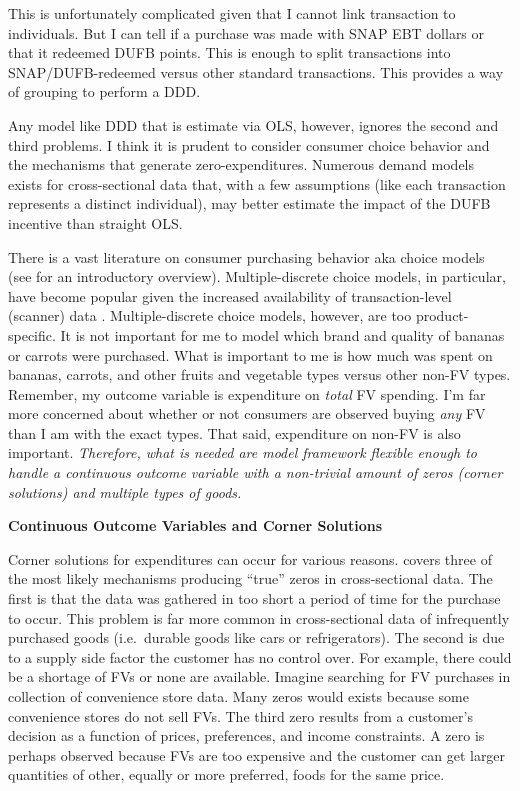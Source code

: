 \documentclass[12pt,letterpaperpaper,]{book}
\begin{document}
This is unfortunately complicated given that I cannot link transaction
to individuals. But I can tell if a purchase was made with SNAP EBT
dollars or that it redeemed DUFB points. This is enough to split
transactions into SNAP/DUFB-redeemed versus other standard transactions.
This provides a way of grouping to perform a DDD.

Any model like DDD that is estimate via OLS, however, ignores the second
and third problems. I think it is prudent to consider consumer choice
behavior and the mechanisms that generate zero-expenditures. Numerous
demand models exists for cross-sectional data that, with a few
assumptions (like each transaction represents a distinct individual),
may better estimate the impact of the DUFB incentive than straight OLS.

There is a vast literature on consumer purchasing behavior aka choice
models (see \citet{train_discrete_2009} for an introductory overview).
Multiple-discrete choice models, in particular, have become popular
given the increased availability of transaction-level (scanner) data
\citep{dube_multiple_2004, hendel_estimating_1999}. Multiple-discrete
choice models, however, are too product-specific. It is not important
for me to model which brand and quality of bananas or carrots were
purchased. What is important to me is how much was spent on bananas,
carrots, and other fruits and vegetable types versus other non-FV types.
Remember, my outcome variable is expenditure on \emph{total} FV
spending. I'm far more concerned about whether or not consumers are
observed buying \emph{any} FV than I am with the exact types. That said,
expenditure on non-FV is also important. \emph{Therefore, what is needed
are model framework flexible enough to handle a continuous outcome
variable with a non-trivial amount of zeros (corner solutions) and
multiple types of goods.}

\textbf{Continuous Outcome Variables and Corner Solutions}

Corner solutions for expenditures can occur for various reasons.
\citet{pudney_modelling_1989} covers three of the most likely mechanisms
producing ``true'' zeros in cross-sectional data. The first is that the
data was gathered in too short a period of time for the purchase to
occur. This problem is far more common in cross-sectional data of
infrequently purchased goods (i.e.~durable goods like cars or
refrigerators). The second is due to a supply side factor the customer
has no control over. For example, there could be a shortage of FVs or
none are available. Imagine searching for FV purchases in collection of
convenience store data. Many zeros would exists because some convenience
stores do not sell FVs. The third zero results from a customer's
decision as a function of prices, preferences, and income constraints. A
zero is perhaps observed because FVs are too expensive and the customer
can get larger quantities of other, equally or more preferred, foods for
the same price.
\end{document}
